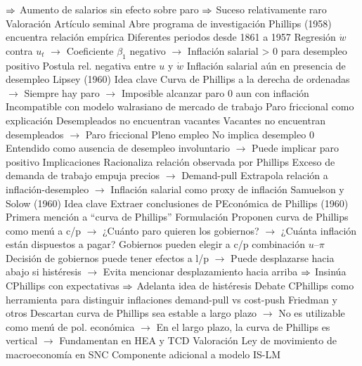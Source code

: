 \documentclass{nuevotema}
\begin{document}
\begin{esquemal}
				\4[] $\Rightarrow$ Aumento de salarios sin efecto sobre paro
				\4[] $\Rightarrow$ Suceso relativamente raro
				\4 Valoración
				\4[] Artículo seminal
				\4[] Abre programa de investigación
				\4 Phillips (1958) encuentra relación empírica
				\4[] Diferentes periodos desde 1861 a 1957
				\4[] Regresión $\dot{w}$ contra $u_t$
				\4[] 
				\4[] $\to$ Coeficiente $\beta_1$ negativo
				\4[] $\to$ Inflación salarial > 0 para desempleo positivo
				\4[$\Rightarrow$] Postula rel. negativa entre $u$ y $\dot{w}$
				\4[$\Rightarrow$] Inflación salarial aún en presencia de desempleo
				\4[] 
			\3 Lipsey (1960)
				\4 Idea clave
				\4[] Curva de Phillips a la derecha de ordenadas
				\4[] $\to$ Siempre hay paro
				\4[] $\to$ Imposible alcanzar paro 0 aun con inflación
				\4[] Incompatible con modelo walrasiano de mercado de trabajo
				\4 Paro friccional como explicación
				\4[] Desempleados no encuentran vacantes
				\4[] Vacantes no encuentran desempleados
				\4[] $\to$ Paro friccional
				\4 Pleno empleo
				\4[] No implica desempleo 0
				\4[] Entendido como ausencia de desempleo involuntario
				\4[] $\to$ Puede implicar paro positivo
				\4 Implicaciones
				\4[] Racionaliza relación observada por Phillips
				\4[] Exceso de demanda de trabajo empuja precios
				\4[] $\to$ Demand-pull
				\4[] Extrapola relación a inflación-desempleo
				\4[] $\to$ Inflación salarial como proxy de inflación
			\3 Samuelson y Solow (1960)
				\4 Idea clave
				\4[] Extraer conclusiones de PEconómica de Phillips (1960)
				\4[] Primera mención a ``curva de Phillips''
				\4 Formulación
				\4[] Proponen curva de Phillips como menú a c/p
				\4[] $\to$ ¿Cuánto paro quieren los gobiernos?
				\4[] $\to$ ¿Cuánta inflación están dispuestos a pagar?
				\4[] Gobiernos pueden elegir a c/p combinación $u$--$\pi$
				\4[] Decisión de gobiernos puede tener efectos a l/p
				\4[] $\to$ Puede desplazarse hacia abajo si histéresis
				\4[] $\to$ Evita mencionar desplazamiento hacia arriba
				\4[] $\Rightarrow$ Insinúa CPhillips con expectativas
				\4[] $\Rightarrow$ Adelanta idea de histéresis
				\4[] Debate CPhillips como herramienta para distinguir
				\4[] inflaciones demand-pull vs cost-push
				\4 Friedman y otros
				\4[] Descartan curva de Phillips sea estable a largo plazo
				\4[] $\to$ No es utilizable como menú de pol. económica
				\4[] $\to$ En el largo plazo, la curva de Phillips es vertical
				\4[] $\to$ Fundamentan en HEA y TCD
			\3 Valoración
				\4 Ley de movimiento de macroeconomía en SNC
				\4[] Componente adicional a modelo IS-LM

\end{esquemal}
\end{document}
